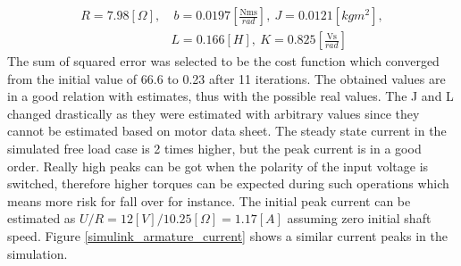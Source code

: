 \documentclass[12pt,english,twoside]{article}
\begin{document}
\begin{equation}
\begin{split}
R=7.98[\Omega],&~b=0.0197[\frac{\text{Nms}}{rad}],~J=0.0121[kgm^2],\\
&L=0.166[H],~K=0.825[\frac{\text{Vs}}{rad}] 
\end{split}
\end{equation}
The sum of squared error was selected to be the cost function which converged from the initial value of 66.6 to 0.23 after 11 iterations. The obtained values are in a good relation with estimates, thus with the possible real values. The J and L changed drastically as they were estimated with arbitrary values since they cannot be estimated based on motor data sheet. The steady state current in the simulated free load case is 2 times higher, but the peak current is in a good order. Really high peaks can be got when the polarity of the input voltage is switched, therefore higher torques can be expected during such operations which means more risk for fall over for instance. The initial peak current can be estimated as $U/R = 12[V]/10.25[\Omega] = 1.17 [A]$ assuming zero initial shaft speed. Figure \ref{simulink_armature_current} shows a similar current peaks in the simulation.
\end{document}
